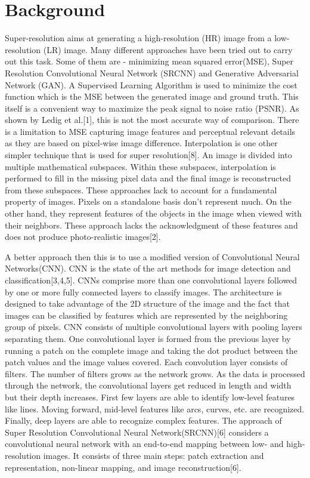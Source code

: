 \section{Background}

Super-resolution aims at generating a high-resolution (HR) image from a
low-resolution (LR) image. Many different approaches have been tried out to
carry out this task. Some of them are - minimizing mean squared error(MSE),
Super Resolution Convolutional Neural Network (SRCNN) and Generative Adversarial
Network (GAN). A Supervised Learning Algorithm is used to minimize the cost
function which is the MSE between the generated image and ground truth. This
itself is a convenient way to maximize the peak signal to noise ratio (PSNR).
As shown by Ledig et al.[1], this is not the most accurate way of comparison.
There is a limitation to MSE capturing image features and perceptual relevant
details as they are based on pixel-wise image difference. Interpolation is one
other simpler technique that is used for super resolution[8]. An image is
divided into multiple mathematical subspaces. Within these subspaces,
interpolation is performed to fill in the missing pixel data and the final image
is reconstructed from these subspaces. These approaches lack to account for a
fundamental property of images. Pixels on a standalone basis don’t represent
much. On the other hand, they represent features of the objects in the image
when viewed with their neighbors. These approach lacks the acknowledgment of
these features and does not produce photo-realistic images[2].

A better approach then this is to use a modified version of Convolutional Neural
Networks(CNN). CNN is the state of the art methods for image detection and
classification[3,4,5]. CNNs comprise more than one convolutional layers followed
by one or more fully connected layers to classify images. The architecture is
designed to take advantage of the 2D structure of the image and the fact that
images can be classified by features which are represented by the neighboring
group of pixels. CNN consists of multiple convolutional layers with pooling
layers separating them. One convolutional layer is formed from the previous
layer by running a patch on the complete image and taking the dot product
between the patch values and the image values covered. Each convolution layer
consists of filters. The number of filters grows as the network grows. As the
data is processed through the network, the convolutional layers get reduced in
length and width but their depth increases. First few layers are able to
identify low-level features like lines. Moving forward, mid-level features like
arcs, curves, etc. are recognized. Finally, deep layers are able to recognize
complex features. The approach of Super Resolution Convolutional Neural
Network(SRCNN)[6] considers a convolutional neural network with an end-to-end
mapping between low- and high-resolution images. It consists of three main
steps: patch extraction and representation, non-linear mapping, and image
reconstruction[6].


